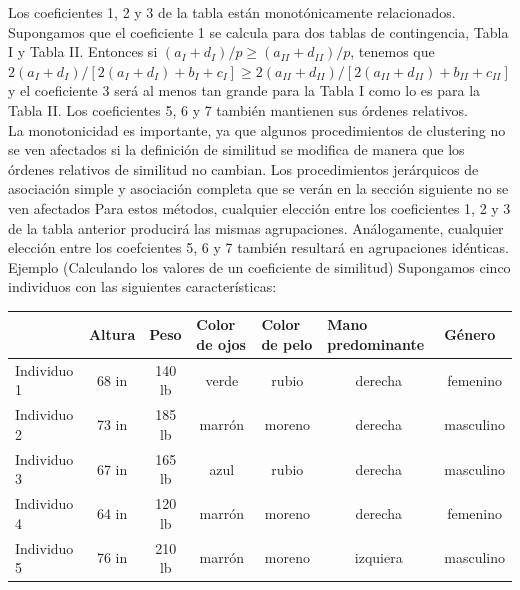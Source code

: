 \documentclass[a4paper, 20pt]{article}
\begin{document}
Los coeficientes 1, 2 y 3 de la tabla están monotónicamente relacionados. Supongamos que el coeficiente 1 se calcula para dos tablas de contingencia, Tabla I y Tabla II. Entonces si $(a_I+d_I)/p \geq (a_{II}+d_{II})/p$, tenemos que $2(a_I+d_I)/[2(a_I+d_I)+b_I+c_I] \geq 2(a_{II}+d_{II})/[2(a_{II}+d_{II})+b_{II}+c_{II}]$ y el coeficiente 3 será al menos tan grande para la Tabla I como lo es para la Tabla II. Los coeficientes 5, 6 y 7 también mantienen sus órdenes relativos.\\

La monotonicidad es importante, ya que algunos procedimientos de clustering no se ven afectados si la definición de similitud se modifica de manera que los órdenes relativos de similitud no cambian. Los procedimientos jerárquicos de asociación simple y asociación completa que se verán en la sección siguiente no se ven afectados Para estos métodos, cualquier elección entre los coeficientes 1, 2 y 3 de la tabla anterior producirá las mismas agrupaciones. Análogamente, cualquier elección entre los coefcientes 5, 6 y 7 también resultará en agrupaciones idénticas.\\

Ejemplo (Calculando los valores de un coeficiente de similitud) Supongamos cinco individuos con las siguientes características:

\begin{table}[]
\begin{tabular}{l|cccccc}
            & \multicolumn{1}{l}{Altura} & \multicolumn{1}{l}{Peso} & \multicolumn{1}{l}{Color de ojos} & \multicolumn{1}{l}{Color de pelo} & \multicolumn{1}{l}{Mano predominante} & \multicolumn{1}{l}{Género} \\ \hline
Individuo 1 & 68 in                      & 140 lb                   & verde                             & rubio                             & derecha                               & femenino                   \\
Individuo 2 & 73 in                      & 185 lb                   & marrón                            & moreno                            & derecha                               & masculino                  \\
Individuo 3 & 67 in                      & 165 lb                   & azul                              & rubio                             & derecha                               & masculino                  \\
Individuo 4 & 64 in                      & 120 lb                   & marrón                            & moreno                            & derecha                               & femenino                   \\
Individuo 5 & 76 in                      & 210 lb                   & marrón                            & moreno                            & izquiera                              & masculino                 
\end{tabular}
\end{table}
\end{document}
